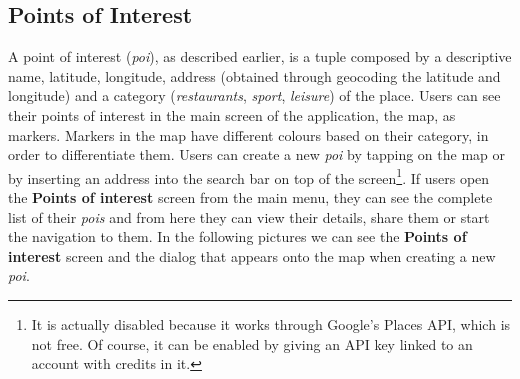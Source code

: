 \documentclass[../../main]{subfiles}
\begin{document}
\subsection{Points of Interest}
\label{ss:final-poi}

A point of interest (\textit{poi}), as described earlier, is a tuple composed by a descriptive name, latitude, longitude, address (obtained through geocoding the latitude and longitude) and a category (\textit{restaurants}, \textit{sport}, \textit{leisure}) of the place.
Users can see their points of interest in the main screen of the application, the map, as markers.
Markers in the map have different colours based on their category, in order to differentiate them.
Users can create a new \textit{poi} by tapping on the map or by inserting an address into the search bar on top of the screen\footnote{It is actually disabled because it works through Google's Places API, which is not free. Of course, it can be enabled by giving an API key linked to an account with credits in it.}.
If users open the \textbf{Points of interest} screen from the main menu, they can see the complete list of their \textit{pois} and from here they can view their details, share them or start the navigation to them.
In the following pictures we can see the \textbf{Points of interest} screen and the dialog that appears onto the map when creating a new \textit{poi}.
\end{document}
